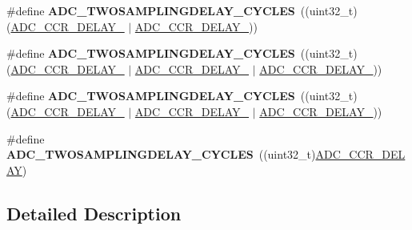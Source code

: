 \begin{DoxyCompactItemize}
\item 
\#define {\bfseries A\+D\+C\+\_\+\+T\+W\+O\+S\+A\+M\+P\+L\+I\+N\+G\+D\+E\+L\+A\+Y\+\_\+C\+Y\+C\+L\+ES}~((uint32\+\_\+t)(\hyperlink{group___peripheral___registers___bits___definition_gae0216de7d6fcfa507c9aa1400972d862}{A\+D\+C\+\_\+\+C\+C\+R\+\_\+\+D\+E\+L\+A\+Y\+\_} $\vert$ \hyperlink{group___peripheral___registers___bits___definition_ga17f85cbda5dcf9a392a29befb73c6ceb}{A\+D\+C\+\_\+\+C\+C\+R\+\_\+\+D\+E\+L\+A\+Y\+\_}))\hypertarget{group___a_d_c__delay__between__2__sampling__phases_gaba99083f97b9869ad8397a04601ad1cb}{}\label{group___a_d_c__delay__between__2__sampling__phases_gaba99083f97b9869ad8397a04601ad1cb}

\item 
\#define {\bfseries A\+D\+C\+\_\+\+T\+W\+O\+S\+A\+M\+P\+L\+I\+N\+G\+D\+E\+L\+A\+Y\+\_\+C\+Y\+C\+L\+ES}~((uint32\+\_\+t)(\hyperlink{group___peripheral___registers___bits___definition_gae0216de7d6fcfa507c9aa1400972d862}{A\+D\+C\+\_\+\+C\+C\+R\+\_\+\+D\+E\+L\+A\+Y\+\_} $\vert$ \hyperlink{group___peripheral___registers___bits___definition_ga17f85cbda5dcf9a392a29befb73c6ceb}{A\+D\+C\+\_\+\+C\+C\+R\+\_\+\+D\+E\+L\+A\+Y\+\_} $\vert$ \hyperlink{group___peripheral___registers___bits___definition_ga22b71e9df8b1fca93802ad602341eb0b}{A\+D\+C\+\_\+\+C\+C\+R\+\_\+\+D\+E\+L\+A\+Y\+\_}))\hypertarget{group___a_d_c__delay__between__2__sampling__phases_ga3d4626768769515ca85ead5834564dd4}{}\label{group___a_d_c__delay__between__2__sampling__phases_ga3d4626768769515ca85ead5834564dd4}

\item 
\#define {\bfseries A\+D\+C\+\_\+\+T\+W\+O\+S\+A\+M\+P\+L\+I\+N\+G\+D\+E\+L\+A\+Y\+\_\+C\+Y\+C\+L\+ES}~((uint32\+\_\+t)(\hyperlink{group___peripheral___registers___bits___definition_gae0216de7d6fcfa507c9aa1400972d862}{A\+D\+C\+\_\+\+C\+C\+R\+\_\+\+D\+E\+L\+A\+Y\+\_} $\vert$ \hyperlink{group___peripheral___registers___bits___definition_ga17f85cbda5dcf9a392a29befb73c6ceb}{A\+D\+C\+\_\+\+C\+C\+R\+\_\+\+D\+E\+L\+A\+Y\+\_} $\vert$ \hyperlink{group___peripheral___registers___bits___definition_ga6d0d5785cb6c75e700517e88af188573}{A\+D\+C\+\_\+\+C\+C\+R\+\_\+\+D\+E\+L\+A\+Y\+\_}))\hypertarget{group___a_d_c__delay__between__2__sampling__phases_ga261b9cf07c6e2c6afd7327a629854408}{}\label{group___a_d_c__delay__between__2__sampling__phases_ga261b9cf07c6e2c6afd7327a629854408}

\item 
\#define {\bfseries A\+D\+C\+\_\+\+T\+W\+O\+S\+A\+M\+P\+L\+I\+N\+G\+D\+E\+L\+A\+Y\+\_\+C\+Y\+C\+L\+ES}~((uint32\+\_\+t)\hyperlink{group___peripheral___registers___bits___definition_ga9c13aa04949ed520cf92613d3a619198}{A\+D\+C\+\_\+\+C\+C\+R\+\_\+\+D\+E\+L\+AY})\hypertarget{group___a_d_c__delay__between__2__sampling__phases_ga1a15072ba873631146f76de174ec66ab}{}\label{group___a_d_c__delay__between__2__sampling__phases_ga1a15072ba873631146f76de174ec66ab}

\end{DoxyCompactItemize}


\subsection{Detailed Description}
